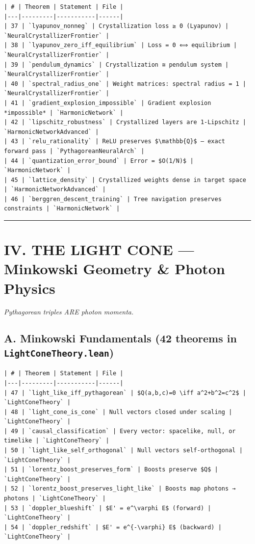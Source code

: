 \documentclass[12pt,a4paper,openany]{book}
\begin{document}
\begin{verbatim}
| # | Theorem | Statement | File |
|---|---------|-----------|------|
| 37 | `lyapunov_nonneg` | Crystallization loss ≥ 0 (Lyapunov) | `NeuralCrystallizerFrontier` |
| 38 | `lyapunov_zero_iff_equilibrium` | Loss = 0 ⟺ equilibrium | `NeuralCrystallizerFrontier` |
| 39 | `pendulum_dynamics` | Crystallization ≅ pendulum system | `NeuralCrystallizerFrontier` |
| 40 | `spectral_radius_one` | Weight matrices: spectral radius = 1 | `NeuralCrystallizerFrontier` |
| 41 | `gradient_explosion_impossible` | Gradient explosion *impossible* | `HarmonicNetwork` |
| 42 | `lipschitz_robustness` | Crystallized layers are 1-Lipschitz | `HarmonicNetworkAdvanced` |
| 43 | `relu_rationality` | ReLU preserves $\mathbb{Q}$ — exact forward pass | `PythagoreanNeuralArch` |
| 44 | `quantization_error_bound` | Error = $O(1/N)$ | `HarmonicNetwork` |
| 45 | `lattice_density` | Crystallized weights dense in target space | `HarmonicNetworkAdvanced` |
| 46 | `berggren_descent_training` | Tree navigation preserves constraints | `HarmonicNetwork` |
\end{verbatim}

\bigskip\hrule\bigskip

\section{IV. THE LIGHT CONE — Minkowski Geometry \& Photon Physics}

\textit{Pythagorean triples ARE photon momenta.}

\subsection{A. Minkowski Fundamentals (42 theorems in \texttt{LightConeTheory.lean})}

\begin{verbatim}
| # | Theorem | Statement | File |
|---|---------|-----------|------|
| 47 | `light_like_iff_pythagorean` | $Q(a,b,c)=0 \iff a^2+b^2=c^2$ | `LightConeTheory` |
| 48 | `light_cone_is_cone` | Null vectors closed under scaling | `LightConeTheory` |
| 49 | `causal_classification` | Every vector: spacelike, null, or timelike | `LightConeTheory` |
| 50 | `light_like_self_orthogonal` | Null vectors self-orthogonal | `LightConeTheory` |
| 51 | `lorentz_boost_preserves_form` | Boosts preserve $Q$ | `LightConeTheory` |
| 52 | `lorentz_boost_preserves_light_like` | Boosts map photons → photons | `LightConeTheory` |
| 53 | `doppler_blueshift` | $E' = e^\varphi E$ (forward) | `LightConeTheory` |
| 54 | `doppler_redshift` | $E' = e^{-\varphi} E$ (backward) | `LightConeTheory` |
\end{verbatim}
\end{document}
